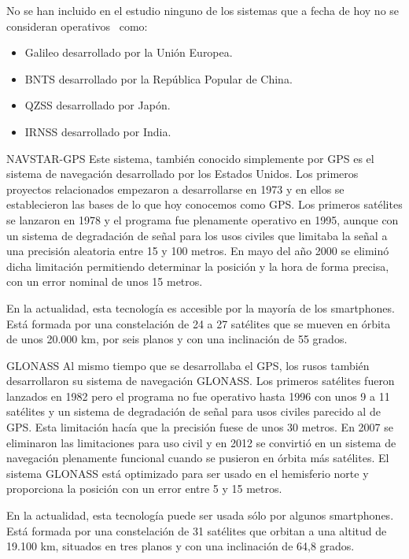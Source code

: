 No se han incluido en el estudio ninguno de los sistemas que a fecha de hoy no se consideran
operativos~\cite{SPSA} como:

\begin{itemize}
  \item Galileo desarrollado por la Unión Europea.
  \item \acf{BNTS} desarrollado por la República Popular de China.
  \item \acf{QZSS} desarrollado por Japón.
  \item \acf{IRNSS} desarrollado por India.
\end{itemize}

\begin{definitionlist}
  \item[\acf{NAVSTAR-GPS}] Este sistema, también conocido simplemente por \acs{GPS} es el sistema
    de navegación desarrollado por los Estados Unidos. Los primeros proyectos relacionados empezaron
    a desarrollarse en 1973 y en ellos se establecieron las bases de lo que hoy conocemos como
    \acs{GPS}. Los primeros satélites se lanzaron en 1978 y el programa fue plenamente operativo en
    1995, aunque con un sistema de degradación de señal para los usos civiles que limitaba la señal
    a una precisión aleatoria entre 15 y 100 metros. En mayo del año 2000 se eliminó dicha
    limitación permitiendo determinar la posición y la hora de forma precisa, con un error nominal
    de unos 15 metros.

    En la actualidad, esta tecnología es accesible por la mayoría de los smartphones. Está formada
    por una constelación de 24 a 27 satélites que se mueven en órbita de unos 20.000 km, por seis
    planos y con una inclinación de 55 grados.

  \item[GLONASS] Al mismo tiempo que se desarrollaba el \acs{GPS}, los rusos también desarrollaron
    su sistema de navegación \acs{GLONASS}. Los primeros satélites fueron lanzados en 1982 pero el
    programa no fue operativo hasta 1996 con unos 9 a 11 satélites y un sistema de degradación de
    señal para usos civiles parecido al de \acs{GPS}. Esta limitación hacía que la precisión fuese
    de unos 30 metros. En 2007 se eliminaron las limitaciones para uso civil y en 2012 se convirtió
    en un sistema de navegación plenamente funcional cuando se pusieron en órbita más satélites. El
    sistema \acs{GLONASS} está optimizado para ser usado en el hemisferio norte y proporciona la
    posición con un error entre 5 y 15 metros.

    En la actualidad, esta tecnología puede ser usada sólo por algunos smartphones. Está formada por
    una constelación de 31 satélites que orbitan a una altitud de 19.100 km, situados en tres planos
    y con una inclinación de 64,8 grados.

\end{definitionlist}


